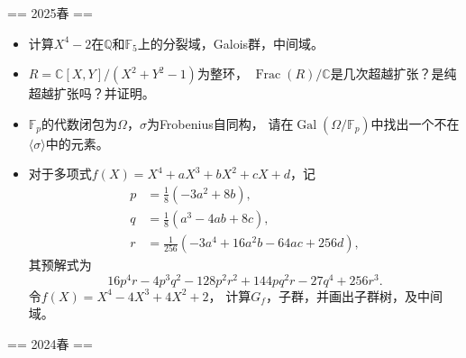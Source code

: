 
== 2025春 ==

\begin{itemize}
\item[一] 计算$X^4-2$在$\mathbb{Q}$和$\mathbb{F}_5$上的分裂域，Galois群，中间域。
\item[二] $R=\mathbb{C}[X,Y]/(X^2+Y^2-1)$为整环，
$\operatorname{Frac}(R)/\mathbb{C}$是几次超越扩张？是纯超越扩张吗？并证明。
\item[三] $\mathbb{F}_p$的代数闭包为$\Omega$，$\sigma$为Frobenius自同构，
请在$\operatorname{Gal}(\Omega/\mathbb{F}_p)$中找出一个不在$\langle\sigma\rangle$中的元素。
\item[四] 对于多项式$f(X)=X^4+aX^3+bX^2+cX+d$，记
\begin{align*}
    p&=\frac{1}{8}(-3a^2+8b),\\
    q&=\frac{1}{8}(a^3-4ab+8c),\\
    r&=\frac{1}{256}(-3a^4+16a^2b-64ac+256d),
\end{align*}
其预解式为
\[16p^4r-4p^3q^2-128p^2r^2+144pq^2r-27q^4+256r^3.\]
令$f(X)=X^4-4X^3+4X^2+2$，
计算$G_f$，子群，并画出子群树，及中间域。
\end{itemize}

== 2024春 ==

